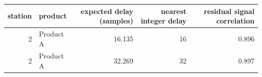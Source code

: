 \begin{tabular}{rlrrr}
\toprule
station & product & expected delay (samples) & nearest integer delay & residual signal correlation \\
\midrule
2 & Product A & 16.135 & 16 & 0.896 \\
2 & Product A & 32.269 & 32 & 0.897 \\
\bottomrule
\end{tabular}
